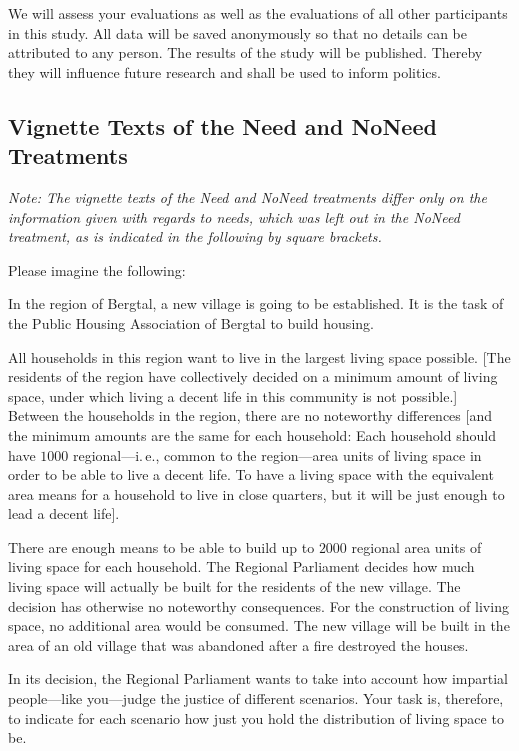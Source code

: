 \documentclass[12pt]{scrartcl}
\begin{document}
We will assess your evaluations as well as the evaluations of all other participants in this study.
All data will be saved anonymously so that no details can be attributed to any person.
The results of the study will be published.
Thereby they will influence future research and shall be used to inform politics.


\subsection*{Vignette Texts of the Need and NoNeed Treatments}
\textit{Note: The vignette texts of the Need and NoNeed treatments differ only on the information given with regards to needs, which was left out in the NoNeed treatment, as is indicated in the following by square brackets.}

\medskip{}
\noindent Please imagine the following:

\noindent In the region of Bergtal, a new village is going to be established.
It is the task of the Public Housing Association of Bergtal to build housing.

All households in this region want to live in the largest living space possible.
{[}The residents of the region have collectively decided on a minimum amount of living space, under which living a decent life in this community is not possible.{]}
Between the households in the region, there are no noteworthy differences {[}and the minimum amounts are the same for each household: Each household should have $1000$ regional---i.\,e., common to the region---area units of living space in order to be able to live a decent life.
To have a living space with the equivalent area means for a household to live in close quarters, but it will be just enough to lead a decent life{]}.

There are enough means to be able to build up to $2000$ regional area units of living space for each household.
The Regional Parliament decides how much living space will actually be built for the residents of the new village.
The decision has otherwise no noteworthy consequences.
For the construction of living space, no additional area would be consumed.
The new village will be built in the area of an old village that was abandoned after a fire destroyed the houses.

In its decision, the Regional Parliament wants to take into account how impartial people---like you---judge the justice of different scenarios.
Your task is, therefore, to indicate for each scenario how just you hold the distribution of living space to be.
\end{document}
